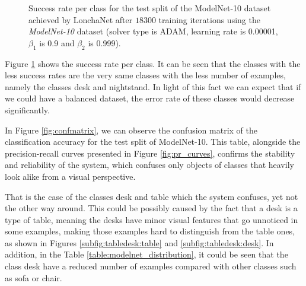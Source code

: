 \begin{figure}[!b]
	\centering
	\caption{Success rate per class for the test split of the ModelNet-10 dataset achieved by LonchaNet after $18300$ training iterations using the \emph{ModelNet-10} dataset (solver type is ADAM, learning rate is 0.00001, $\beta_1$ is 0.9 and $\beta_2$ is 0.999).}
	\label{fig:success_per_class}
\end{figure}


Figure \ref{fig:success_per_class} shows the success rate per class. It can be seen that the classes with the less success rates are the very same classes with the less number of examples, namely the classes desk and nightstand. In light of this fact we can expect that if we could have a balanced dataset, the error rate of these classes would decrease significantly.

In Figure \ref{fig:confmatrix}, we can observe the confusion matrix of the classification accuracy for the test split of ModelNet-10. This table, alongside the precision-recall curves presented in Figure \ref{fig:pr_curves}, confirms the stability and reliability of the system, which confuses only objects of classes that heavily look alike from a visual perspective.

That is the case of the classes desk and table which the system confuses, yet not the other way around. This could be possibly caused by the fact that a desk is a type of table, meaning the desks have minor visual features that go unnoticed in some examples, making those examples hard to distinguish from the table ones, as shown in Figures \ref{subfig:tabledesk:table} and \ref{subfig:tabledesk:desk}.
In addition, in the Table \ref{table:modelnet_distribution}, it could be seen that the class desk have a reduced number of examples compared with other classes such as sofa or chair.

